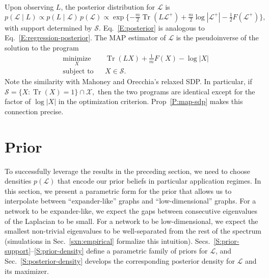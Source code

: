 \documentclass[12pt]{article}
\DeclareMathOperator*{\Tr}{Tr}
\theoremstyle{plain}
\begin{document}
Upon observing $L$, the posterior distribution for $\mathcal{L}$ is
\begin{equation}\label{E:posterior}
  p(\mathcal{L} \mid L)
    \propto p(L \mid \mathcal{L}) \, p (\mathcal{L})
    \propto \exp\{ -\tfrac{m}{2} \Tr(L \mathcal{L}^+)
                   + \tfrac{m}{2} \log |\mathcal{L}^+|
                   - \tfrac{1}{2} F(\mathcal{L^+}) \},
\end{equation}
with support determined by $\mathcal{S}$.  Eq.~\eqref{E:posterior} is
analogous to Eq.~\eqref{E:regression-posterior}.  The MAP estimator of
$\mathcal{L}$ is the pseudoinverse of the solution to the program
\[
\begin{aligned}
  & \underset{X}{\text{minimize}}
  & & \Tr(L X) + \tfrac{1}{m} F(X) - \log |X| \\
  & \text{subject to}
  & & X \in \mathcal{S}.
\end{aligned}
\]
Note the similarity with Mahoney and Orecchia's relaxed SDP.
In particular, if
\(
  \mathcal{S} = \{ X : \Tr(X) = 1 \} \cap \mathcal{X},
\)
then the two programs are identical except for the factor of
$\log |X|$ in the optimization criterion.  Prop~\ref{P:map-sdp} makes
this connection precise.



\section{Prior}
\label{sxn:priors}

To successfully leverage the results in the preceding section, we need
to choose densities $p(\mathcal{L})$ that encode our prior beliefs in
particular application regimes.  In this section, we present a
parametric form for the prior that allows us to interpolate between
``expander-like'' graphs and ``low-dimensional'' graphs.  For a
network to be expander-like, we expect the gaps between consecutive
eigenvalues of the Laplacian to be small.  For a network to be
low-dimensional, we expect the smallest non-trivial eigenvalues to be
well-separated from the rest of the spectrum (simulations in
Sec.~\ref{sxn:empirical} formalize this intuition).
Secs.~\ref{S:prior-support}--\ref{S:prior-density} define a
parametric family of priors for $\mathcal{L}$, and
Sec.~\ref{S:posterior-density} develops the corresponding posterior
density for $\mathcal{L}$ and its maximizer.
\end{document}
